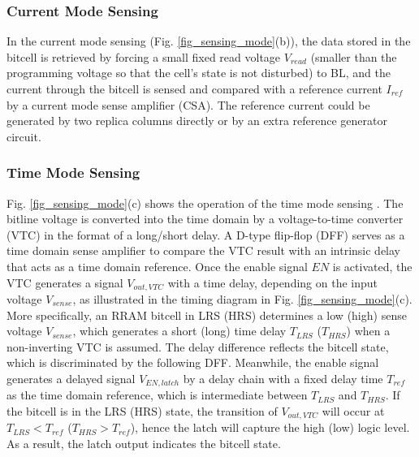 \subsubsection{Current Mode Sensing} In the current mode sensing  \cite{jain201913, lo2018reram} (Fig. \ref{fig_sensing_mode}(b)), the data stored in the bitcell is retrieved by forcing a small fixed read voltage $V_{read}$ (smaller than the programming voltage so that the cell's state is not disturbed) to BL, and the 
current through the bitcell is sensed and compared with a reference current $I_{ref}$ by a current mode sense amplifier (CSA). The reference current could be generated by two replica columns directly or by an extra reference generator circuit.

\subsubsection{Time Mode Sensing} Fig. \ref{fig_sensing_mode}(c) shows the operation of the time mode sensing \cite{trinh2018time}. 
The bitline voltage is converted into the time domain by a voltage-to-time converter (VTC) in the format of a long/short delay. A D-type flip-flop (DFF) serves as a time domain sense amplifier to compare the VTC result with an intrinsic delay that acts as a time domain reference. 
Once the enable signal $EN$ is activated, the VTC generates a signal $V_{out,VTC}$ with a time delay, depending on the input voltage $V_{sense}$, as illustrated in the timing diagram in Fig. \ref{fig_sensing_mode}(c). More specifically, an RRAM bitcell in LRS (HRS) determines a low (high) sense voltage $V_{sense}$, which generates a short (long) time delay $T_{LRS}$ ($T_{HRS}$) when a non-inverting VTC is assumed. The delay difference reflects the bitcell state, which is discriminated by the following DFF. Meanwhile, the enable signal generates a delayed signal $V_{EN,latch}$ by a delay chain with a fixed delay time $T_{ref}$ as the time domain reference, which is intermediate between $T_{LRS}$ and $T_{HRS}$. If the bitcell is in the LRS (HRS) state, the transition of $V_{out,VTC}$ will occur at $T_{LRS}<T_{ref}$ ($T_{HRS}>T_{ref}$), hence the latch will capture the high (low) logic level. As a result, the latch output indicates the bitcell state. 

